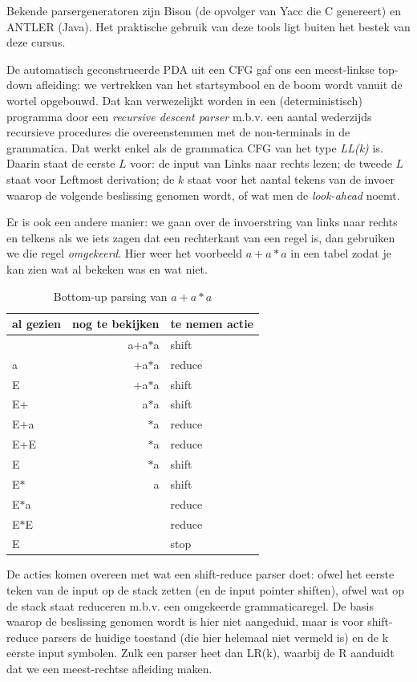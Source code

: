 Bekende parsergeneratoren zijn Bison (de opvolger van Yacc die C
genereert) en ANTLER (Java). Het praktische gebruik van deze tools
ligt buiten het bestek van deze cursus.


De automatisch geconstrueerde PDA uit een CFG gaf ons een meest-linkse
top-down afleiding: we vertrekken van het startsymbool en de boom wordt 
vanuit de wortel opgebouwd. Dat kan verwezelijkt worden in een
(deterministisch) programma door een {\em recursive descent parser}
m.b.v. een aantal wederzijds recursieve procedures die overeenstemmen
met de non-terminals in de grammatica. Dat werkt enkel als de
grammatica CFG van het type {\em LL(k)} is. Daarin staat de eerste $L$
voor: de input van Links naar rechts lezen; de tweede $L$ staat voor
Leftmost derivation; de $k$ staat voor het aantal tekens van de invoer
waarop de volgende beslissing genomen wordt, of wat men de {\em
look-ahead} noemt.  


Er is ook een andere manier: we gaan over de invoerstring van links
naar rechts en telkens als we iets zagen dat een rechterkant van een
regel is, dan gebruiken we die regel {\em omgekeerd}. Hier weer het
voorbeeld $a+a*a$ in een tabel zodat je kan zien wat al bekeken was en
wat niet.


\begin{table}[ht]
\center
\begin{tabular}{|l|r|l|}
\hline
al gezien  & nog te bekijken & te nemen actie \\ \hline
           & a+a$*$a           & shift    \\ 
   a       &  +a$*$a           & reduce   \\ 
   E       &  +a$*$a           & shift    \\ 
   E+      &  a$*$a            & shift    \\ 
   E+a     &   $*$a            & reduce   \\ 
   E+E     &  $*$a             & reduce   \\ 
   E       &  $*$a             & shift    \\ 
   E$*$      &   a             & shift    \\ 
   E$*$a     &                 & reduce   \\ 
   E$*$E     &                 & reduce   \\ 
   E       &                 & stop   \\ 
\hline
\end{tabular}
\caption{Bottom-up parsing van $a+a*a$} \label{bottomup}
\end{table}
De acties komen overeen met wat een shift-reduce parser doet: ofwel
het eerste teken van de input op de stack zetten (en de input pointer
shiften), ofwel wat op de stack staat reduceren m.b.v. een omgekeerde
grammaticaregel. De basis waarop de beslissing genomen wordt is hier
niet aangeduid, maar is voor shift-reduce parsers de huidige toestand
(die hier helemaal niet vermeld is) en de k eerste input
symbolen. Zulk een parser heet dan LR(k), waarbij de R aanduidt dat we
een meest-rechtse afleiding maken.


